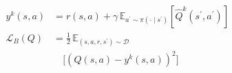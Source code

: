 \documentclass[border=7pt]{standalone}
\begin{document}
\color{ink}
$\displaystyle \begin{aligned} y^k(s,a)&=r(s,a)+\gamma\,\mathbb E_{a^\prime\sim\pi(\cdot\mid s^\prime)}[\widehat Q^k(s^\prime,a^\prime)]\\ \mathcal L_B(Q)&=\frac12\,\mathbb E_{(s,a,r,s^\prime)\sim\mathcal D}\\ &\quad\big[(Q(s,a)-y^k(s,a))^2\big]\end{aligned}$
\end{document}
